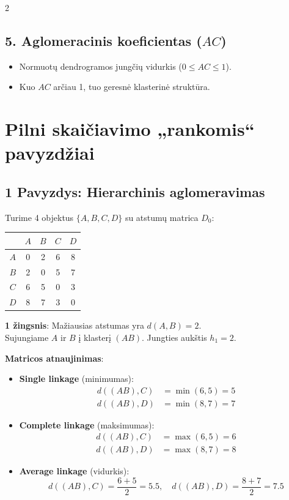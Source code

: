 \documentclass[9pt,a4paper]{article}
\begin{document}
\begin{multicols*}{2}
\subsection{5. Aglomeracinis koeficientas ($AC$)}
\begin{itemize}
    \item Normuotų dendrogramos jungčių vidurkis ($0 \le AC \le 1$).
    \item Kuo $AC$ arčiau 1, tuo geresnė klasterinė struktūra.
\end{itemize}

\section{Pilni skaičiavimo „rankomis“ pavyzdžiai}

\subsection{1 Pavyzdys: Hierarchinis aglomeravimas}
Turime 4 objektus $\{A, B, C, D\}$ su atstumų matrica $D_0$:
\begin{center}
\begin{tabular}{c|cccc}
 & $A$ & $B$ & $C$ & $D$ \\
\hline
$A$ & 0 & 2 & 6 & 8 \\
$B$ & 2 & 0 & 5 & 7 \\
$C$ & 6 & 5 & 0 & 3 \\
$D$ & 8 & 7 & 3 & 0 \\
\end{tabular}
\end{center}

\textbf{1 žingsnis}: Mažiausias atstumas yra $d(A, B) = 2$.\\
Sujungiame $A$ ir $B$ į klasterį $(AB)$. Jungties aukštis $h_1 = 2$.

\textbf{Matricos atnaujinimas}:
\begin{itemize}
    \item \textbf{Single linkage} (minimumas):
    \begin{align*}
        d((AB), C) &= \min(6, 5) = 5 \\
        d((AB), D) &= \min(8, 7) = 7
    \end{align*}
    \item \textbf{Complete linkage} (maksimumas):
    \begin{align*}
        d((AB), C) &= \max(6, 5) = 6 \\
        d((AB), D) &= \max(8, 7) = 8
    \end{align*}
    \item \textbf{Average linkage} (vidurkis):
    \begin{equation*}
        d((AB), C) = \frac{6 + 5}{2} = 5.5, \quad d((AB), D) = \frac{8 + 7}{2} = 7.5
    \end{equation*}
\end{itemize}


\end{multicols*}
\end{document}
